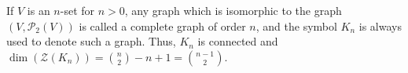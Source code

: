 If $V$ is an $n$-set for $n > 0$, any graph which is isomorphic to the graph $(V, \mathcal{P}_2(V))$ is called a complete graph of order $n$, and the symbol $K_n$ is always used to denote such a graph. Thus, $K_n$ is connected and $\dim(\mathcal{Z}(K_n)) = \binom{n}{2} - n + 1 = \binom{n-1}{2}$.
